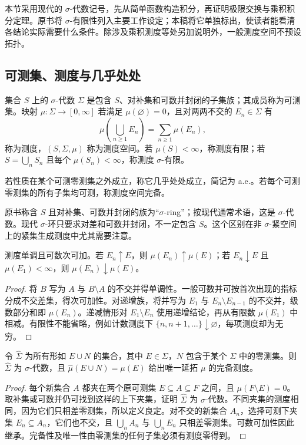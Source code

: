 本节采用现代的 $\sigma$-代数记号，先从简单函数构造积分，再证明极限交换与乘积积分定理。原书将 $\sigma$-有限性列入主要工作设定；本稿将它单独标出，使读者能看清各结论实际需要什么条件。除涉及乘积测度等处另加说明外，一般测度空间不预设拓扑。

\subsection{可测集、测度与几乎处处}
\begin{definition}\label{def:y0-measure}
集合 $S$ 上的 $\sigma$-代数 $\Sigma$ 是包含 $S$、对补集和可数并封闭的子集族；其成员称为可测集。映射 $\mu:\Sigma\to[0,\infty]$ 若满足 $\mu(\varnothing)=0$，且对两两不交的 $E_n\in\Sigma$ 有
\[
 \mu\left(\bigcup_{n\ge1}E_n\right)=\sum_{n\ge1}\mu(E_n),
\]
称为测度，$(S,\Sigma,\mu)$ 称为测度空间。若 $\mu(S)<\infty$，称测度有限；若 $S=\bigcup_nS_n$ 且每个 $\mu(S_n)<\infty$，称测度 $\sigma$-有限。

若性质在某个可测零测集之外成立，称它几乎处处成立，简记为 a.e.。若每个可测零测集的所有子集均可测，称测度空间完备。
\end{definition}

原书称含 $S$ 且对补集、可数并封闭的族为“$\sigma$-ring”；按现代通常术语，这是 $\sigma$-代数。现代 $\sigma$-环只要求对差和可数并封闭，不一定包含 $S$。这个区别在非 $\sigma$-紧空间上的紧集生成测度中尤其需要注意。

\begin{proposition}[测度的基本极限性质]\label{prop:y0-measure-continuity}
测度单调且可数次可加。若 $E_n\uparrow E$，则 $\mu(E_n)\uparrow\mu(E)$；若 $E_n\downarrow E$ 且 $\mu(E_1)<\infty$，则 $\mu(E_n)\downarrow\mu(E)$。
\end{proposition}
\begin{proof}
将 $B$ 写为 $A$ 与 $B\setminus A$ 的不交并得单调性。一般可数并可按首次出现的指标分成不交差集，得次可加性。对递增族，将并写为 $E_1$ 与 $E_n\setminus E_{n-1}$ 的不交并，级数部分和即 $\mu(E_n)$。递减情形对 $E_1\setminus E_n$ 使用递增结论，再从有限数 $\mu(E_1)$ 中相减。有限性不能省略，例如计数测度下 $\{n,n+1,\ldots\}\downarrow\varnothing$，每项测度却为无穷。
\end{proof}

\begin{proposition}[测度的完备化]\label{prop:y0-completion-measure}
令 $\widehat\Sigma$ 为所有形如 $E\cup N$ 的集合，其中 $E\in\Sigma$，$N$ 包含于某个 $\Sigma$ 中的零测集。则 $\widehat\Sigma$ 为 $\sigma$-代数，且 $\widehat\mu(E\cup N)=\mu(E)$ 给出唯一延拓 $\mu$ 的完备测度。
\end{proposition}
\begin{proof}
每个新集合 $A$ 都夹在两个原可测集 $E\subseteq A\subseteq F$ 之间，且 $\mu(F\setminus E)=0$。取补集或可数并仍可找到这样的上下夹集，证明 $\widehat\Sigma$ 为 $\sigma$-代数。不同夹集的测度相同，因为它们只相差零测集，所以定义良定。对不交的新集合 $A_n$，选择可测下夹集 $E_n\subseteq A_n$，它们也不交，且 $\bigcup_nA_n$ 与 $\bigcup_nE_n$ 只相差零测集。可数可加性因此继承。完备性及唯一性由零测集的任何子集必须有测度零得到。
\end{proof}


